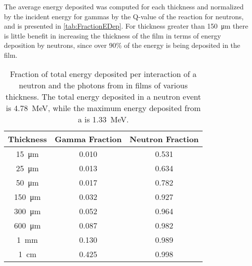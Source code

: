 The average energy deposited was computed for each thickness and normalized by the incident energy for gammas by the Q-value of the reaction for neutrons, and is presented in \autoref{tab:FractionEDep}.
For thickness greater than \SI{150}{\um} there is little benefit in increasing the thickness of the film in terms of energy deposition by neutrons, since over 90\% of the energy is being deposited in the film.
\begin{table}
    \caption[Fractional Energy Deposition per Interaction for Various Thickness]{Fraction of total energy deposited per interaction of a neutron and the photons from  in films of various thickness. The total energy deposited in a neutron event is \SI{4.78}{\MeV}, while the maximum energy deposited from a  is \SI{1.33}{\MeV}.\EnergyDepSimGeo}
	\centering
	\begin{tabular}{c | c c}
	Thickness & Gamma Fraction & Neutron Fraction \\
	\hline
	\hline
	\SI{15}{\um} & 0.010 & 0.531 \\
	\SI{25}{\um} & 0.013 & 0.634 \\
	\SI{50}{\um} & 0.017 & 0.782 \\
	\SI{150}{\um} & 0.032 & 0.927 \\
	\SI{300}{\um} & 0.052 & 0.964 \\
	\SI{600}{\um} & 0.087 & 0.982 \\
	\SI{1}{\mm} & 0.130 & 0.989 \\
	\SI{1}{\cm} & 0.425 & 0.998 \\
	\end{tabular}
  \label{tab:FractionEDep}
\end{table}

